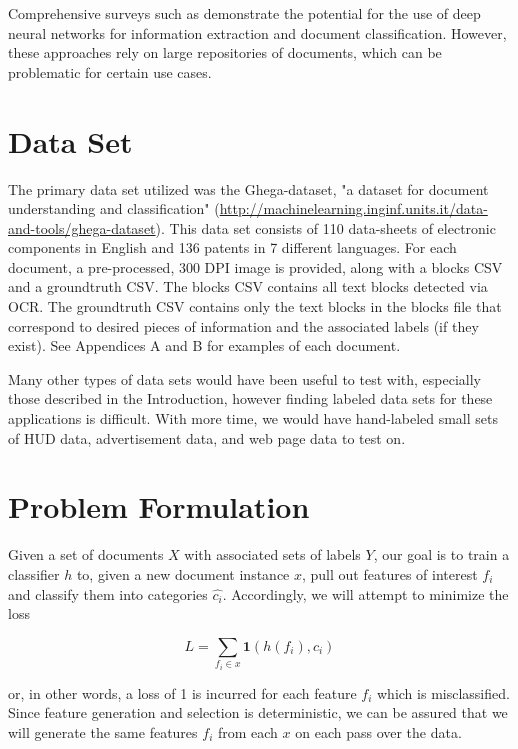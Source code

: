 \documentclass[twoside,11pt]{article}
\renewcommand{\>}{{\rightarrow}}
\renewcommand{\hat}{\widehat}
\newcommand{\1}{{\mathbf 1}}
\newcommand{\0}{{\mathbf 0}}
\begin{document}
Comprehensive surveys such as \cite{Kumar2017, Nguyen2017} demonstrate the potential for the use of deep neural networks for information extraction and document classification. However, these approaches rely on large repositories of documents, which can be problematic for certain use cases.


\section{Data Set}
The primary data set utilized was the Ghega-dataset, "a dataset for document understanding and classification" (\url{http://machinelearning.inginf.units.it/data-and-tools/ghega-dataset}). This data set consists of 110 data-sheets of electronic components in English and 136 patents in 7 different languages. For each document, a pre-processed, 300 DPI image is provided, along with a blocks CSV and a groundtruth CSV. The blocks CSV contains all text blocks detected via OCR. The groundtruth CSV contains only the text blocks in the blocks file that correspond to desired pieces of information and the associated labels (if they exist). See Appendices A and B for examples of each document.

Many other types of data sets would have been useful to test with, especially those described in the Introduction, however finding labeled data sets for these applications is difficult. With more time, we would have hand-labeled small sets of HUD data, advertisement data, and web page data to test on.


\section{Problem Formulation}
Given a set of documents $X$ with associated sets of labels $Y$, our goal is to train a classifier $h$ to, given a new document instance $x$, pull out features of interest $f_i$ and classify them into categories $\hat{c_i}$. Accordingly, we will attempt to minimize the loss

\[ L = \sum_{f_i \in x}{\mathbf{1}(h(f_i), c_i)} \]

or, in other words, a loss of 1 is incurred for each feature $f_i$ which is misclassified. Since feature generation and selection is deterministic, we can be assured that we will generate the same features $f_i$ from each $x$ on each pass over the data.
\end{document}
